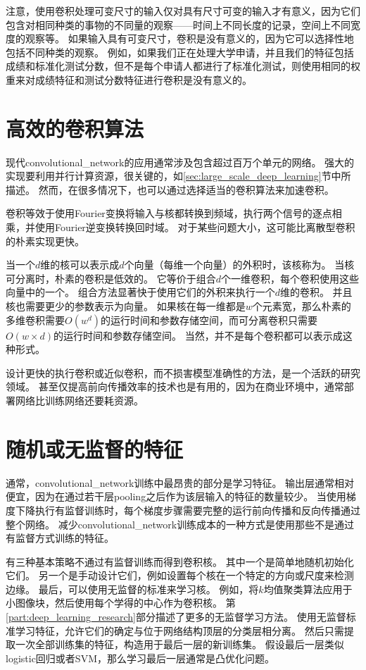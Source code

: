 注意，使用卷积处理可变尺寸的输入仅对具有尺寸可变的输入才有意义，因为它们包含对相同种类的事物的不同量的观察——时间上不同长度的记录，空间上不同宽度的观察等。
如果输入具有可变尺寸，卷积是没有意义的，因为它可以选择性地包括不同种类的观察。
例如，如果我们正在处理大学申请，并且我们的特征包括成绩和标准化测试分数，但不是每个申请人都进行了标准化测试，则使用相同的权重来对成绩特征和测试分数特征进行卷积是没有意义的。

\section{高效的卷积算法}
\label{sec:efficient_convolution_algorithms}

现代\gls{convolutional_network}的应用通常涉及包含超过百万个单元的网络。
强大的实现要利用并行计算资源，很关键的，如\ref{sec:large_scale_deep_learning}节中所描述。
然而，在很多情况下，也可以通过选择适当的卷积算法来加速卷积。
 
 
卷积等效于使用Fourier变换将输入与核都转换到频域，执行两个信号的逐点相乘，并使用Fourier逆变换转换回时域。
对于某些问题大小，这可能比离散型卷积的朴素实现更快。

当一个$d$维的核可以表示成$d$个向量（每维一个向量）的外积时，该核称为。
当核可分离时，朴素的卷积是低效的。
它等价于组合$d$个一维卷积，每个卷积使用这些向量中的一个。
组合方法显著快于使用它们的外积来执行一个$d$维的卷积。
并且核也需要更少的参数表示为向量。
如果核在每一维都是$w$个元素宽，那么朴素的多维卷积需要$O(w^d)$的运行时间和参数存储空间，而可分离卷积只需要$O(w\times d)$的运行时间和参数存储空间。
当然，并不是每个卷积都可以表示成这种形式。

设计更快的执行卷积或近似卷积，而不损害模型准确性的方法，是一个活跃的研究领域。 
甚至仅提高前向传播效率的技术也是有用的，因为在商业环境中，通常部署网络比训练网络还要耗资源。

\section{随机或无监督的特征}
\label{sec:random_or_unsupervised_features}

通常，\gls{convolutional_network}训练中最昂贵的部分是学习特征。 
输出层通常相对便宜，因为在通过若干层\gls{pooling}之后作为该层输入的特征的数量较少。
当使用梯度下降执行有监督训练时，每个梯度步骤需要完整的运行前向传播和反向传播通过整个网络。
减少\gls{convolutional_network}训练成本的一种方式是使用那些不是通过有监督方式训练的特征。

有三种基本策略不通过有监督训练而得到卷积核。
其中一个是简单地随机初始化它们。
另一个是手动设计它们，例如设置每个核在一个特定的方向或尺度来检测边缘。
最后，可以使用无监督的标准来学习核。
例如，\cite{Coates2011}将$k$均值聚类算法应用于小图像块，然后使用每个学得的中心作为卷积核。
第\ref{part:deep_learning_research}部分描述了更多的无监督学习方法。
使用无监督标准学习特征，允许它们的确定与位于网络结构顶层的分类层相分离。
然后只需提取一次全部训练集的特征，构造用于最后一层的新训练集。
假设最后一层类似logistic回归或者SVM，那么学习最后一层通常是凸优化问题。
 
